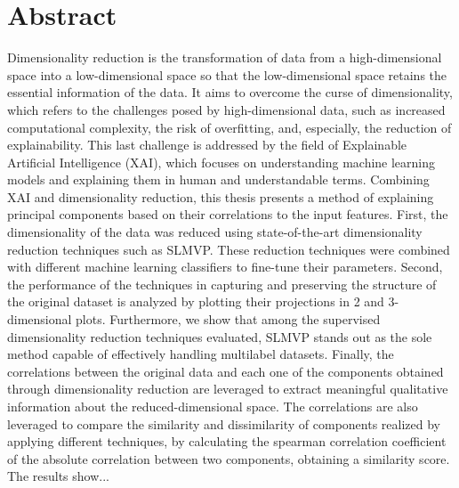 \newpage

\chapter*{Abstract}

Dimensionality reduction is the transformation of data from a high-dimensional space into a low-dimensional space so that the low-dimensional space retains the essential information of the data. It aims to overcome the curse of dimensionality, which refers to the challenges posed by high-dimensional data, such as increased computational complexity, the risk of overfitting, and, especially, the reduction of explainability.
This last challenge is addressed by the field of Explainable Artificial Intelligence (XAI), which focuses on understanding machine learning models and explaining them in human and understandable terms. Combining XAI and dimensionality reduction, this thesis presents a method of explaining principal components based on their correlations to the input features.
First, the dimensionality of the data was reduced using state-of-the-art dimensionality reduction techniques such as SLMVP. These reduction techniques were combined with different machine learning classifiers to fine-tune their parameters.
Second, the performance of the techniques in capturing and preserving the structure of the original dataset is analyzed by plotting their projections in 2 and 3-dimensional plots.
Furthermore, we show that among the supervised dimensionality reduction techniques evaluated, SLMVP stands out as the sole method capable of effectively handling multilabel datasets.
Finally, the correlations between the original data and each one of the components obtained through dimensionality reduction  are leveraged to extract meaningful qualitative information about the reduced-dimensional space.
The correlations are also leveraged to compare the similarity and dissimilarity of components realized by applying different techniques, by calculating the spearman correlation coefficient of the absolute correlation between two components, obtaining a similarity score.
The results show... %

